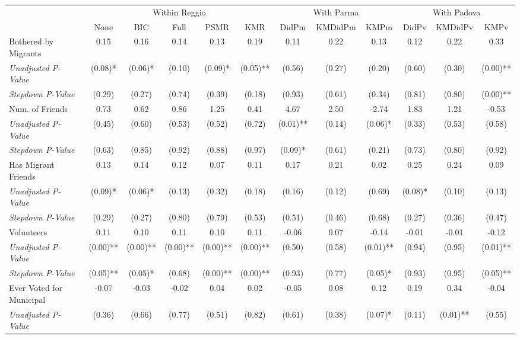 \begin{tabular}{l c c c c c c c c c c c}
\toprule
& \multicolumn{5}{c}{Within Reggio} & \multicolumn{3}{c}{With Parma} & \multicolumn{3}{c}{With Padova} \\\cmidrule(lr){2-6} \cmidrule(lr){7-9} \cmidrule(lr){10-12}
 & None & BIC & Full & PSMR & KMR & DidPm & KMDidPm & KMPm & DidPv & KMDidPv & KMPv \\
\midrule
Bothered by Migrants & 0.15 & 0.16 & 0.14 & 0.13 & 0.19 & 0.11 & 0.22 & 0.13 & 0.12 & 0.22 & 0.33 \\
\quad \textit{Unadjusted P-Value} & (0.08)* & (0.06)* & (0.10) & (0.09)* & (0.05)** & (0.56) & (0.27) & (0.20) & (0.60) & (0.30) & (0.00)** \\
\quad \textit{Stepdown P-Value} & (0.29) & (0.27) & (0.74) & (0.39) & (0.18) & (0.93) & (0.61) & (0.34) & (0.81) & (0.80) & (0.00)** \\
Num. of Friends & 0.73 & 0.62 & 0.86 & 1.25 & 0.41 & 4.67 & 2.50 & -2.74 & 1.83 & 1.21 & -0.53 \\
\quad \textit{Unadjusted P-Value} & (0.45) & (0.60) & (0.53) & (0.52) & (0.72) & (0.01)** & (0.14) & (0.06)* & (0.33) & (0.53) & (0.58) \\
\quad \textit{Stepdown P-Value} & (0.63) & (0.85) & (0.92) & (0.88) & (0.97) & (0.09)* & (0.61) & (0.21) & (0.73) & (0.80) & (0.92) \\
Has Migrant Friends & 0.13 & 0.14 & 0.12 & 0.07 & 0.11 & 0.17 & 0.21 & 0.02 & 0.25 & 0.24 & 0.09 \\
\quad \textit{Unadjusted P-Value} & (0.09)* & (0.06)* & (0.13) & (0.32) & (0.18) & (0.16) & (0.12) & (0.69) & (0.08)* & (0.10) & (0.13) \\
\quad \textit{Stepdown P-Value} & (0.29) & (0.27) & (0.80) & (0.79) & (0.53) & (0.51) & (0.46) & (0.68) & (0.27) & (0.36) & (0.47) \\
Volunteers & 0.11 & 0.10 & 0.11 & 0.10 & 0.11 & -0.06 & 0.07 & -0.14 & -0.01 & -0.01 & -0.12 \\
\quad \textit{Unadjusted P-Value} & (0.00)** & (0.00)** & (0.00)** & (0.00)** & (0.00)** & (0.50) & (0.58) & (0.01)** & (0.94) & (0.95) & (0.01)** \\
\quad \textit{Stepdown P-Value} & (0.05)** & (0.05)* & (0.68) & (0.00)** & (0.00)** & (0.93) & (0.77) & (0.05)* & (0.93) & (0.95) & (0.05)** \\
Ever Voted for Municipal & -0.07 & -0.03 & -0.02 & 0.04 & 0.02 & -0.05 & 0.08 & 0.12 & 0.19 & 0.34 & -0.04 \\
\quad \textit{Unadjusted P-Value} & (0.36) & (0.66) & (0.77) & (0.51) & (0.82) & (0.61) & (0.38) & (0.07)* & (0.11) & (0.01)** & (0.55) \\

\end{tabular}
